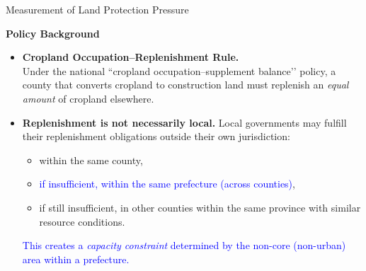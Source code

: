 \documentclass[10pt, xcolor=x11names,compress, aspectratio=169]{beamer}
\begin{document}
\begin{frame}{Measurement of Land Protection Pressure}

\textbf{Policy Background}

\begin{itemize}\setlength{\itemsep}{8pt}

\item[(1)] \textbf{Cropland Occupation–Replenishment Rule.}  \\
Under the national “cropland occupation–supplement balance’’ policy, a county that converts cropland to construction land must replenish an \textit{equal amount} of cropland elsewhere.

\item[(2)] \textbf{Replenishment is not necessarily local.}  
Local governments may fulfill their replenishment obligations outside their own jurisdiction:
\begin{itemize}
    \item within the same county,
    \item \textcolor{blue}{if insufficient, within the same prefecture (across counties)\footnotemark[1]}, 
    \item if still insufficient, in other counties within the same province with similar resource conditions\footnotemark[1].
\end{itemize}

\textcolor{blue}{This creates a \textit{capacity constraint} determined by the non-core (non-urban) area within a prefecture.}  

\end{itemize}


\end{frame}
\end{document}
